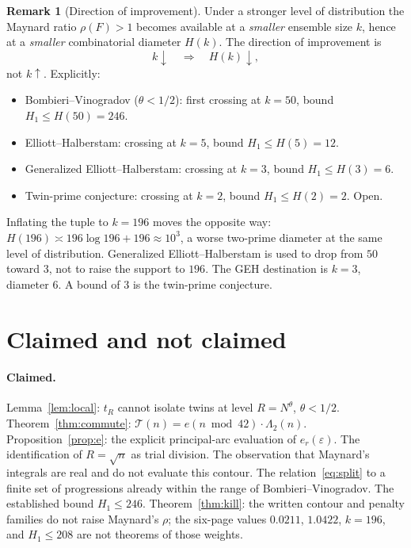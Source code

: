 \documentclass[11pt,a4paper]{article}
\theoremstyle{plain}
\theoremstyle{definition}
\newtheorem{remark}{Remark}
\theoremstyle{plain}
\numberwithin{equation}{section}
\begin{document}
\begin{remark}[Direction of improvement]
\label{rem:kdown}
Under a stronger level of distribution the Maynard ratio \(\rho(F)>1\) becomes available at a \emph{smaller} ensemble size \(k\), hence at a \emph{smaller} combinatorial diameter \(H(k)\). The direction of improvement is
\[
k\downarrow \quad\Longrightarrow\quad H(k)\downarrow,
\]
not \(k\uparrow\). Explicitly:
\begin{itemize}
\item Bombieri--Vinogradov (\(\theta<1/2\)): first crossing at \(k=50\), bound \(H_1\le H(50)=246\).
\item Elliott--Halberstam: crossing at \(k=5\), bound \(H_1\le H(5)=12\).
\item Generalized Elliott--Halberstam: crossing at \(k=3\), bound \(H_1\le H(3)=6\).
\item Twin-prime conjecture: crossing at \(k=2\), bound \(H_1\le H(2)=2\). Open.
\end{itemize}
Inflating the tuple to \(k=196\) moves the opposite way: \(H(196)\asymp 196\log 196+196\approx 10^{3}\), a worse two-prime diameter at the same level of distribution. Generalized Elliott--Halberstam is used to drop from \(50\) toward \(3\), not to raise the support to \(196\). The GEH destination is \(k=3\), diameter \(6\). A bound of \(3\) is the twin-prime conjecture.
\end{remark}

\section{Claimed and not claimed}

\paragraph{Claimed.}
Lemma~\ref{lem:local}: \(t_R\) cannot isolate twins at level \(R=N^{\theta}\), \(\theta<1/2\).
Theorem~\ref{thm:commute}: \(\mathcal{T}(n)=e(n\bmod 42)\cdot\Lambda_2(n)\).
Proposition~\ref{prop:e}: the explicit principal-arc evaluation of \(e_r(\varepsilon)\).
The identification of \(R=\sqrt{n}\) as trial division.
The observation that Maynard's integrals are real and do not evaluate this contour.
The relation~\eqref{eq:split} to a finite set of progressions already within the range of Bombieri--Vinogradov.
The established bound \(H_1\le 246\).
Theorem~\ref{thm:kill}: the written contour and penalty families do not raise Maynard's \(\rho\); the six-page values \(0.0211\), \(1.0422\), \(k=196\), and \(H_1\le 208\) are not theorems of those weights.
\end{document}
